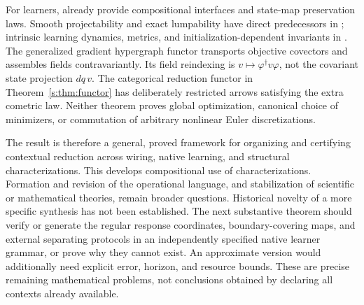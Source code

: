 \documentclass[11pt]{article}
\theoremstyle{definition}
\theoremstyle{remark}\newtheorem{remark}[theorem]{Remark}
\begin{document}
For learners, \cite{FST,CGGWZ,spivak} already provide compositional
interfaces and state-map preservation laws. Smooth projectability and
exact lumpability have direct predecessors in \cite{HA}; intrinsic learning
dynamics, metrics, and initialization-dependent invariants in \cite{MPG}.
The generalized gradient hypergraph functor \cite{HFK} transports objective
covectors and assembles fields contravariantly. Its field reindexing is
$v\mapsto\varphi^\dagger v\varphi$, not the covariant state projection
$dq\,v$. The categorical reduction functor in
Theorem~\ref{s:thm:functor} has deliberately restricted arrows satisfying
the extra cometric law. Neither theorem proves global optimization,
canonical choice of minimizers, or commutation of arbitrary nonlinear
Euler discretizations.

The result is therefore a general, proved framework for organizing and
certifying contextual reduction across wiring, native learning, and
structural characterizations.
This develops compositional use of characterizations. Formation and revision
of the operational language, and stabilization of scientific or mathematical
theories, remain broader questions. Historical novelty of a more specific
synthesis has not been established. The next substantive theorem should
verify or generate the regular response coordinates, boundary-covering
maps, and external separating protocols in an independently specified
native learner grammar, or prove why they cannot exist. An approximate
version would additionally need explicit error, horizon, and resource
bounds. These are precise remaining mathematical problems, not conclusions
obtained by declaring all contexts already available.
\end{document}
